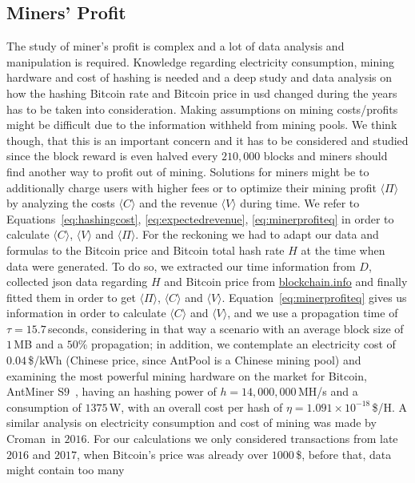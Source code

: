\documentclass[USenglish]{uit-thesis}
\begin{document}
\subsection{Miners' Profit}
\label{sec:minersprofit}
The study of miner's profit is complex and a lot of
data analysis and manipulation is required. Knowledge
regarding electricity consumption, mining hardware and
cost of hashing is needed and a deep study and data analysis
on how the hashing Bitcoin rate and Bitcoin price in \gls{usd}
changed during the years has to be taken into consideration.
Making assumptions on mining costs/profits might be
difficult due to the information withheld from mining pools.
We think though, that this is an important concern and it has
to be considered and studied since the block reward is even
halved every $210,000$ blocks and miners should find another
way to profit out of mining. Solutions for miners might be to
additionally charge users with higher fees or to optimize
their mining profit $\langle \Pi \rangle$ by analyzing
the costs $\langle C \rangle$ and the revenue $\langle V \rangle$
during time. We refer to Equations~\ref{eq:hashingcost},
\ref{eq:expectedrevenue},
\ref{eq:minerprofiteq} in order to calculate
$\langle C \rangle$, $\langle V \rangle$ and $\langle \Pi \rangle$.
For the reckoning
we had to adapt our data and formulas to the
Bitcoin price and Bitcoin total hash rate $H$ at the time
when data were generated. To do so, we extracted our
time information from $D$, collected \gls{json} data
regarding $H$ and Bitcoin price from \url{blockchain.info}
and finally fitted them in order to get $\langle \Pi \rangle$,
$\langle C \rangle$ and $\langle V \rangle$.
Equation~\ref{eq:minerprofiteq} gives us information
in order to calculate $\langle C \rangle$ and
$\langle V \rangle$, and we use
a propagation time of $\tau = 15.7$\,seconds,
considering in that way a scenario with
an average block size of $1$\,MB and
a $50$\% propagation; in addition, we contemplate
an electricity cost of $0.04$\,\$/kWh (Chinese price, since
AntPool is a Chinese mining pool) and
examining the most powerful
mining hardware on the market for Bitcoin,
AntMiner S$9$~\cite{antminerS9}, having an hashing power
of $h = 14,000,000$\,MH/s and a consumption
of $1375$\,W, with an overall cost per hash of
$\eta = 1.091 \times 10^{-18}$\,\$/H.
A similar analysis on electricity consumption and
cost of mining was made by Croman\,\cite{croman2016}
in $2016$.
For our calculations we only considered transactions from
late $2016$ and $2017$, when Bitcoin's price was already over
$1000$\,\$, before that, data might contain too many
\end{document}
